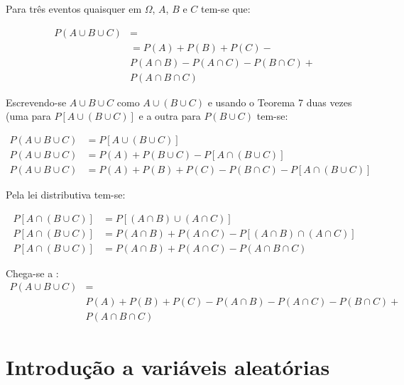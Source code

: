 \documentclass[
]{book}
\begin{document}
Para três eventos quaisquer em \(\Omega\), \(A\), \(B\) e \(C\) tem-se que:

\hfill\break

\begin{align*}
P( A \cup B \cup C ) & = \\
                     & = P(A) + P(B) +P(C) - \\
                     & P(A \cap B) - P(A \cap C) - P(B \cap C)  + \\
                     & P(A \cap B \cap C)
\end{align*}

\hfill\break

Escrevendo-se \(A \cup B \cup C\) como \(A \cup (B \cup C)\) e usando o Teorema 7 duas vezes (uma para \(P[A \cup (B \cup C)]\) e a outra para \(P( B \cup C)\) tem-se:

\hfill\break

\begin{align*}
P( A \cup B \cup C) &  = P[ A \cup (B \cup C)] \\
P( A \cup B \cup C) & = P(A) + P( B \cup C) - P [A \cap (B \cup C)]\\
P( A \cup B \cup C) & = P(A) + P(B) + P(C) - P (B \cap C) - P [A \cap (B \cup C)]
\end{align*}

\hfill\break

Pela lei distributiva tem-se:

\hfill\break

\begin{align*}
P [A \cap (B \cup C)] & = P[ (A \cap B) \cup (A \cap C )  ]\\
P [A \cap (B \cup C)] & = P(A \cap B) + P(A \cap C) - P[ ( A \cap B) \cap (A \cap C)] \\
P [A \cap (B \cup C)] & = P(A \cap B) + P(A \cap C) - P( A \cap B \cap C)
\end{align*}

\hfill\break

Chega-se a :\\

\begin{align*}
P( A \cup B \cup C ) & = \\
                     & P(A) + P(B) +P(C) - P(A \cap B) - P(A \cap C) - P(B \cap C)  +\\
                     & P(A \cap B \cap C)
\end{align*}

\hypertarget{introduuxe7uxe3o-a-variuxe1veis-aleatuxf3rias}{%
\chapter{Introdução a variáveis aleatórias}\label{introduuxe7uxe3o-a-variuxe1veis-aleatuxf3rias}}
\end{document}
